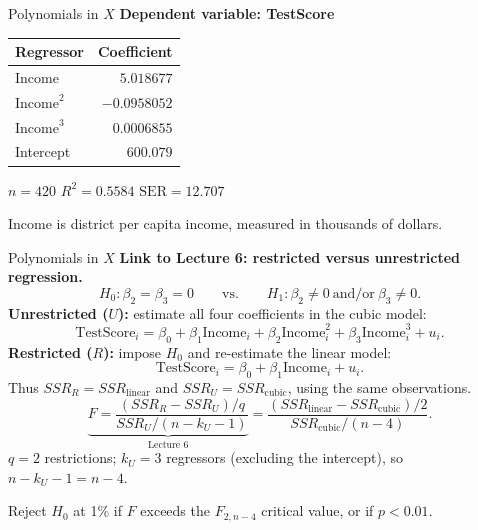 \documentclass[notes,10pt, aspectratio=169]{beamer}
\begin{document}
\begin{frame}{Polynomials in $X$}
\textbf{Dependent variable: TestScore}
\begin{center}
\renewcommand{\arraystretch}{1.2}
\begin{tabular}{lr}
\toprule
Regressor & Coefficient \\
\midrule
$\text{Income}$ & $5.018677$ \\
$\text{Income}^2$ & $-0.0958052$ \\
$\text{Income}^3$ & $0.0006855$ \\
Intercept & $600.079$ \\
\bottomrule
\end{tabular}

\medskip
$n=420$ \qquad $R^2=0.5584$ \qquad $\mathrm{SER}=12.707$
\end{center}
\small Income is district per capita income, measured in thousands of dollars.
\end{frame}


\begin{frame}{Polynomials in $X$}
\small
\textbf{Link to Lecture 6: restricted versus unrestricted regression.}
\[
H_0:\beta_2=\beta_3=0
\qquad\text{vs.}\qquad
H_1:\beta_2\neq0\ \text{and/or}\ \beta_3\neq0.
\]
\textbf{Unrestricted ($U$):} estimate all four coefficients in the cubic model:
\[
\text{TestScore}_i=\beta_0+\beta_1\text{Income}_i
+\beta_2\text{Income}_i^2+\beta_3\text{Income}_i^3+u_i.
\]
\textbf{Restricted ($R$):} impose $H_0$ and re-estimate the linear model:
\[
\text{TestScore}_i=\beta_0+\beta_1\text{Income}_i+u_i.
\]
Thus $SSR_R=SSR_{\mathrm{linear}}$ and $SSR_U=SSR_{\mathrm{cubic}}$, using the same observations.
\[
\underbrace{F=\frac{(SSR_R-SSR_U)/q}{SSR_U/(n-k_U-1)}}_{\text{Lecture 6}}
=\frac{(SSR_{\mathrm{linear}}-SSR_{\mathrm{cubic}})/2}{SSR_{\mathrm{cubic}}/(n-4)}.
\]
$q=2$ restrictions; $k_U=3$ regressors (excluding the intercept), so $n-k_U-1=n-4$.
\medskip

Reject $H_0$ at 1\% if $F$ exceeds the $F_{2,n-4}$ critical value, or if $p<0.01$.
\end{frame}
\end{document}
